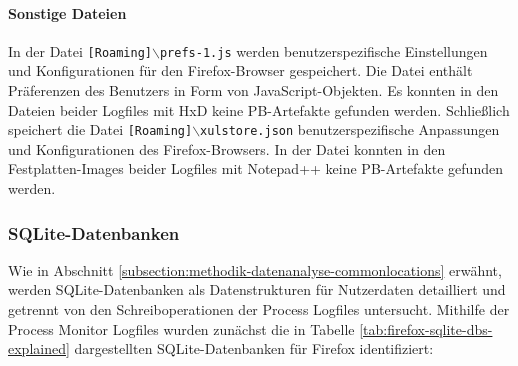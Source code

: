 \begin{appendices}
\paragraph*{Sonstige Dateien}
In der Datei \texttt{[Roaming]$\backslash$prefs-1.js} werden benutzerspezifische Einstellungen und Konfigurationen für den Firefox-Browser gespeichert. Die Datei enthält Präferenzen des Benutzers in Form von JavaScript-Objekten. Es konnten in den Dateien beider Logfiles mit HxD keine PB-Artefakte gefunden werden. 
Schließlich speichert die Datei \texttt{[Roaming]$\backslash$xulstore.json} benutzerspezifische Anpassungen und Konfigurationen des Firefox-Browsers. In der Datei konnten in den Festplatten-Images beider Logfiles mit Notepad++ keine PB-Artefakte gefunden werden. \cite{mozillazine.29.12.2022}

\subsubsection*{SQLite-Datenbanken}
\label{appendix:firefox-sqlite}
Wie in Abschnitt \ref{subsection:methodik-datenanalyse-commonlocations} erwähnt, werden SQLite-Datenbanken als Datenstrukturen für Nutzerdaten detailliert und getrennt von den Schreiboperationen der Process Logfiles untersucht. Mithilfe der Process Monitor Logfiles wurden zunächst die in Tabelle \ref{tab:firefox-sqlite-dbs-explained} dargestellten SQLite-Datenbanken für Firefox identifiziert:
\begin{table}[h!]
\centering
\caption{Firefox: Veränderte SQLite-Datenbanken und deren Verwendungszwecke}
\label{tab:firefox-sqlite-dbs-explained}
\end{table}
\end{appendices}
